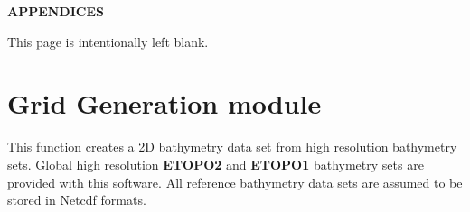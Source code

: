\documentclass[12pt]{article}
\newcommand{\pstyle}{plain}
\newcommand{\pb}{\strut \vfill \pagebreak}
\newcommand{\bpage}{\vfill \pagebreak \strut

\vspace{2.5in} \centerline{This page is intentionally left blank.}}
\newcommand{\bpagea}{\strut

\vspace{2.5in} \centerline{This page is intentionally left blank.}}
\newcommand{\newsec}{\setcounter{equation}{0}
                     \setcounter{myfigno}{0}
                     \setcounter{mytabno}{0}}
\newcounter{myfigno}[section]
\newcounter{mytabno}[section]
\begin{document}
\pb
\setcounter{footnote}{0}


%


\pb \strut


\vspace{2.5in} \centerline{\large \bf APPENDICES}
\appendix

\bpage
\pb \newsec \setcounter{page}{1} \pagestyle{\pstyle}
\renewcommand{\thepage}{\thesection.\arabic{page}}
\section{Grid Generation module}
This function creates a 2D bathymetry data set from high resolution bathymetry sets. Global high resolution {\bf ETOPO2} and {\bf ETOPO1} bathymetry sets are provided with this software. All reference bathymetry data sets are assumed to be stored in Netcdf formats. 
\end{document}
